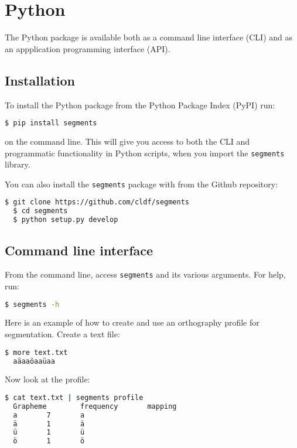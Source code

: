 \section{Python}
\label{python-implementations}

The Python package is available both as a command line interface (CLI) 
and as an appplication programming interface (API).

\subsection*{Installation}

To install the Python package from the Python Package Index (PyPI) run:

\begin{lstlisting}[language=bash]
  $ pip install segments
\end{lstlisting}

\noindent on the command line. This will give you access to both 
the CLI and programmatic functionality in Python scripts, when 
you import the \texttt{segments} library.

You can also install the \texttt{segments} 
package with from the Github repository:

\begin{lstlisting}[language=bash]
  $ git clone https://github.com/cldf/segments
  $ cd segments
  $ python setup.py develop
\end{lstlisting}


\subsection*{Command line interface}

From the command line, access \texttt{segments} and its 
various arguments. For help, run:

\begin{lstlisting}[language=bash]
  $ segments -h
\end{lstlisting}

\noindent Here is an example of how to create and use an orthography 
profile for segmentation. Create a text file:

\begin{lstlisting}[language=bash]
  $ more text.txt
  aäaaöaaüaa
\end{lstlisting}

\noindent Now look at the profile:

\begin{lstlisting}[language=bash,texcl=true]
  $ cat text.txt | segments profile
  Grapheme        frequency       mapping
  a       7       a
  ä       1       ä
  ü       1       ü
  ö       1       ö
\end{lstlisting}

